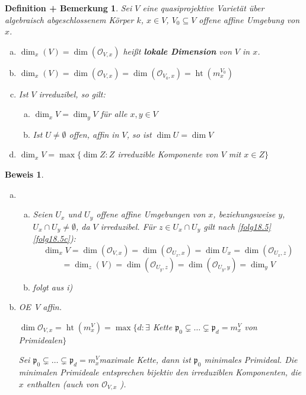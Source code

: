 \documentclass[a4paper, 12pt, numbers=noendperiod, chapterprefix=true, headsepline]{scrbook}
\theoremstyle{break}
\newtheorem{DefBem}[Def]{Definition + Bemerkung}
\theoremstyle{nonumberbreak}
\newtheorem{Bew}{Beweis}
\theoremstyle{nonumberplain}
\newcommand{\emp}[1]{\textbf{\emph{#1}}}
\newcommand{\deftermspec}[2]{{\index{#2}}\emp{#1}}
\DeclareMathOperator{\Ht}{ht}
\newcommand{\calO}{\mathcal{O}}
\renewcommand{\OE}{O\!\!E~}
\begin{document}
\begin{DefBem}\label{18.6}
Sei $V$ eine quasiprojektive Variet\"at \"uber algebraisch abgeschlossenem K\"orper $k$, $x\in V$, $V_0\subseteq V$ offene affine Umgebung von $x$.\begin{enumerate}[a)]
\item
	$\dim_x(V)=\dim(\calO_{V,x})$ hei\ss t \deftermspec{lokale Dimension}{Dimension!lokale-} von $V$ in $x$.
\item
	$\dim_x(V)=\dim(\calO_{V,x})=\dim(\calO_{V_0,x})=\Ht(m_x^{V_0})$
\item
	Ist $V$ irreduzibel, so gilt:\begin{enumerate}[a)]
	\item[i)]
		$\dim_xV=\dim_yV$ f\"ur alle $x,y\in V$
	\item[ii)]
		Ist $U\ne\emptyset$ offen, affin in $V$, so ist $\dim U=\dim V$
	\end{enumerate}
\item
	$\dim_xV=\max\{\dim Z: Z$ irreduzible Komponente von $V$ mit $x\in Z\}$
\end{enumerate}\end{DefBem}

\begin{Bew}\begin{enumerate}[a)]
\item[c)]\begin{enumerate}[a)]
	\item[i)]
		Seien $U_x$ und $U_y$ offene affine Umgebungen von $x$, beziehungsweise $y$, $U_x\cap U_y\ne\emptyset$, da $V$ irreduzibel. F\"ur $z\in U_x\cap U_y$ gilt nach \ref{folg18.5} \ref{folg18.5c}):
			\[\dim_xV=\dim(\calO_{V,x})=\dim(\calO_{U_x,x})=\dim U_x=\dim(\calO_{U_x,z})\]
			\[=\dim_z(V)=\dim(\calO_{U_y,z})=\dim(\calO_{U_y,y})=\dim_y V\]
	\item[ii)]
		folgt aus i)\end{enumerate}
\item[d)]
	\OE $V$ affin.
	
	$\dim\calO_{V,x}=\Ht(m_x^V)=\max\{d:\exists$ Kette $\mathfrak p_0 \subsetneq\ldots \subsetneq\mathfrak p_d=m_x^V$ von Primidealen$\}$
	
	Sei $\mathfrak p_0 \subsetneq\ldots \subsetneq\mathfrak p_d=m_x^V$maximale Kette, dann ist $\mathfrak p_0$ minimales Primideal. Die minimalen Primideale entsprechen bijektiv den irreduziblen Komponenten, die $x$ enthalten (auch von $\calO_{V,x}$ ).
\end{enumerate}\end{Bew}
\end{document}
